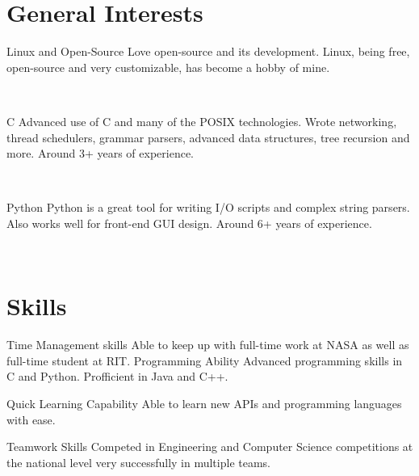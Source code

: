 \documentclass[print]{cv-style}          %
\begin{document}
\section{General Interests}
  \vspace{-0.3cm}
\begin{entrylist}
\entry
{}
{Linux and Open-Source}
{}
{Love open-source and its development. Linux, being free, open-source and very customizable, has become a hobby of mine. }

\end{entrylist}\
\begin{entrylist}
\entry
{}
{C}
{}
{Advanced use of C and many of the POSIX technologies. Wrote networking, thread schedulers, grammar parsers, advanced data structures, tree recursion and more. Around 3+ years of experience.}
\end{entrylist}\
\begin{entrylist}
\entry
{}
{Python}
{}
{Python is a great tool for writing I/O scripts and complex string parsers. Also works well for front-end GUI design. Around 6+ years of experience.}

\end{entrylist}\

\section{Skills}
  \vspace{-0.2cm}

\begin{entrylist}
\entry
  {}
  {Time Management skills}
  {}
  {Able to keep up with full-time work at NASA as well as full-time student at RIT.}
\entry
  {}
  {Programming Ability }
  {}
  {Advanced programming skills in C and Python. Profficient in Java and C++.}
  
  \entry
  {}
  {Quick Learning Capability}
  {}
  {Able to learn new APIs and programming languages with ease.}
  
  \entry
  {}
  {Teamwork Skills}
  {}
  {Competed in Engineering and Computer Science competitions at the national level very successfully in multiple teams.}

  

\end{entrylist}
\end{document}

